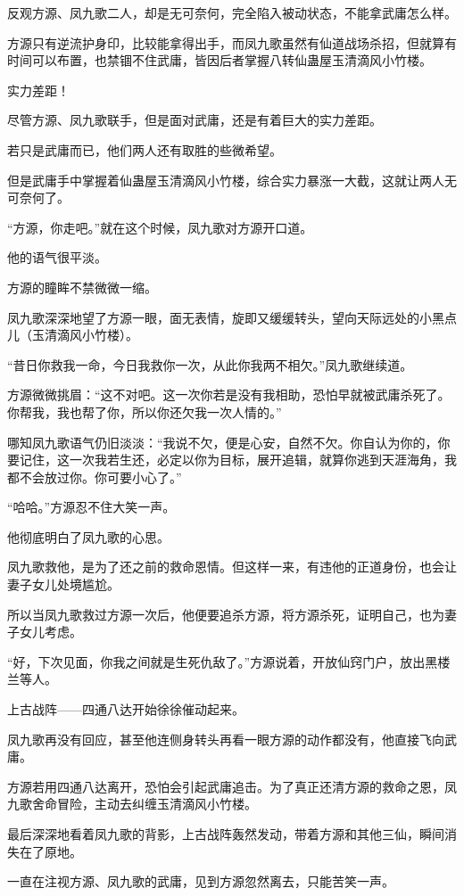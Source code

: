 \begin{this_body}
反观方源、凤九歌二人，却是无可奈何，完全陷入被动状态，不能拿武庸怎么样。

方源只有逆流护身印，比较能拿得出手，而凤九歌虽然有仙道战场杀招，但就算有时间可以布置，也禁锢不住武庸，皆因后者掌握八转仙蛊屋玉清滴风小竹楼。

实力差距！

尽管方源、凤九歌联手，但是面对武庸，还是有着巨大的实力差距。

若只是武庸而已，他们两人还有取胜的些微希望。

但是武庸手中掌握着仙蛊屋玉清滴风小竹楼，综合实力暴涨一大截，这就让两人无可奈何了。

“方源，你走吧。”就在这个时候，凤九歌对方源开口道。

他的语气很平淡。

方源的瞳眸不禁微微一缩。

凤九歌深深地望了方源一眼，面无表情，旋即又缓缓转头，望向天际远处的小黑点儿（玉清滴风小竹楼）。

“昔日你救我一命，今日我救你一次，从此你我两不相欠。”凤九歌继续道。

方源微微挑眉：“这不对吧。这一次你若是没有我相助，恐怕早就被武庸杀死了。你帮我，我也帮了你，所以你还欠我一次人情的。”

哪知凤九歌语气仍旧淡淡：“我说不欠，便是心安，自然不欠。你自认为你的，你要记住，这一次我若生还，必定以你为目标，展开追辑，就算你逃到天涯海角，我都不会放过你。你可要小心了。”

“哈哈。”方源忍不住大笑一声。

他彻底明白了凤九歌的心思。

凤九歌救他，是为了还之前的救命恩情。但这样一来，有违他的正道身份，也会让妻子女儿处境尴尬。

所以当凤九歌救过方源一次后，他便要追杀方源，将方源杀死，证明自己，也为妻子女儿考虑。

“好，下次见面，你我之间就是生死仇敌了。”方源说着，开放仙窍门户，放出黑楼兰等人。

上古战阵——四通八达开始徐徐催动起来。

凤九歌再没有回应，甚至他连侧身转头再看一眼方源的动作都没有，他直接飞向武庸。

方源若用四通八达离开，恐怕会引起武庸追击。为了真正还清方源的救命之恩，凤九歌舍命冒险，主动去纠缠玉清滴风小竹楼。

最后深深地看着凤九歌的背影，上古战阵轰然发动，带着方源和其他三仙，瞬间消失在了原地。

一直在注视方源、凤九歌的武庸，见到方源忽然离去，只能苦笑一声。


\end{this_body}
